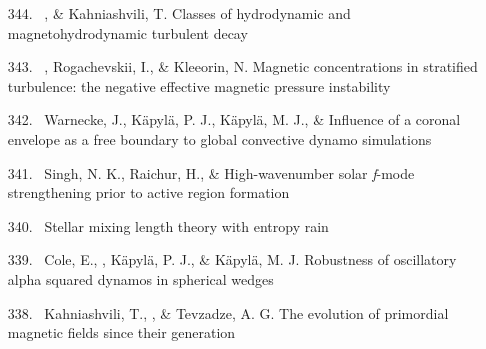 \begin{itemize}
\item[{344.}~]
\Brandenburg, \& Kahniashvili, T.
{Classes of hydrodynamic and magnetohydrodynamic turbulent decay}

\item[{343.}~]
\Brandenburg, Rogachevskii, I., \& Kleeorin, N.
{Magnetic concentrations in stratified turbulence: the negative effective magnetic pressure instability}

\item[{342.}~]
Warnecke, J., K\"apyl\"a, P. J., K\"apyl\"a, M. J., \& \Brandenburg{}
{Influence of a coronal envelope as a free boundary to global convective dynamo simulations}

\item[{341.}~]
Singh, N. K., Raichur, H., \& \Brandenburg{}
{High-wavenumber solar {\em f}-mode strengthening prior to active region formation}

\item[{340.}~]
\Brandenburg{}
{Stellar mixing length theory with entropy rain}

\item[{339.}~]
Cole, E., \Brandenburg, K\"apyl\"a, P. J., \& K\"apyl\"a, M. J.
{Robustness of oscillatory alpha squared dynamos in spherical wedges}

\item[{338.}~]
Kahniashvili, T., \Brandenburg, \& Tevzadze, A. G.
{The evolution of primordial magnetic fields since their generation}


\end{itemize}
